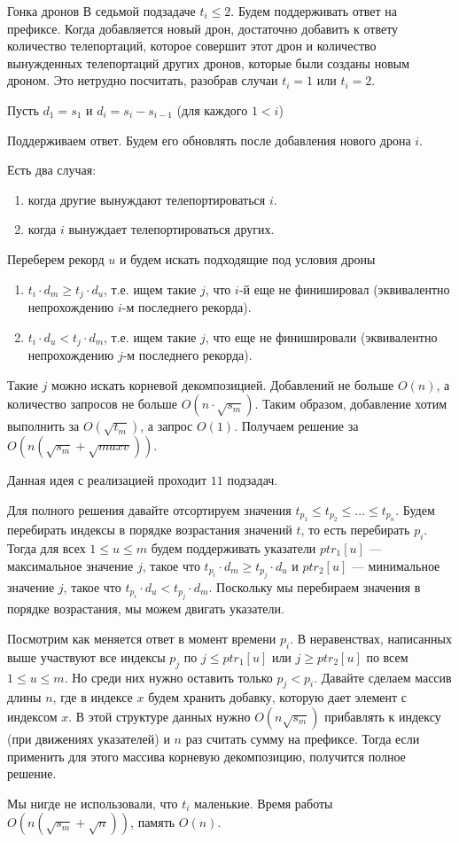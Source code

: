 \begin{tutorial}{Гонка дронов}
В седьмой подзадаче $t_i \le 2$. Будем поддерживать ответ на префиксе. Когда добавляется новый дрон, достаточно добавить к ответу количество телепортаций, которое совершит этот дрон и количество вынужденных телепортаций других дронов, которые были созданы новым дроном. Это нетрудно посчитать, разобрав случаи $t_i = 1$ или $t_i = 2$. 

Пусть $d_1 = s_1$ и $d_i = s_i-s_{i-1}$ (для каждого $1<i$)

Поддерживаем ответ. Будем его обновлять после добавления нового дрона $i$.

Есть два случая:

\begin{enumerate}
\item когда другие вынуждают телепортироваться $i$.
\item когда $i$ вынуждает телепортироваться других.
\end{enumerate}

Переберем рекорд $u$ и будем искать подходящие под условия дроны

\begin{enumerate}
\item $t_i\cdot d_m \geq t_j\cdot d_u$, т.е. ищем такие $j$, что $i$-й еще не финишировал (эквивалентно непрохождению $i$-м последнего рекорда).
\item $t_i\cdot d_u < t_j\cdot d_m$, т.е. ищем такие $j$, что еще не финишировали (эквивалентно непрохождению $j$-м последнего рекорда).
\end{enumerate}

Такие $j$ можно искать корневой декомпозицией. Добавлений не больше $O(n)$, а количество запросов не больше $O(n\cdot \sqrt{s_m})$. Таким образом, добавление хотим выполнить за $O(\sqrt{t_m})$, а запрос $O(1)$. Получаем решение за $O(n (\sqrt{s_m} + \sqrt{maxv}))$.

Данная идея с реализацией проходит $11$ подзадач. 

Для полного решения давайте отсортируем значения $t_{p_1} \leq t_{p_2} \leq \ldots \leq t_{p_n}$. Будем перебирать индексы в порядке возрастания значений $t$, то есть перебирать $p_i$. Тогда для всех $1 \leq u \leq m$ будем поддерживать указатели $ptr_1[u]$ --- максимальное значение $j$, такое что $t_{p_i}\cdot d_m \geq t_{p_j}\cdot d_u$ и $ptr_2[u]$ --- минимальное значение $j$, такое что $t_{p_i}\cdot d_u < t_{p_j}\cdot d_m$. Поскольку мы перебираем значения в порядке возрастания, мы можем двигать указатели.

Посмотрим как меняется ответ в момент времени $p_i$. В неравенствах, написанных выше участвуют все индексы $p_j$ по $j \leq ptr_1[u]$ или $j \geq ptr_2[u]$ по всем $1 \leq u \leq m$. Но среди них нужно оставить только $p_j < p_i$. Давайте сделаем массив длины $n$, где в индексе $x$ будем хранить добавку, которую дает элемент с индексом $x$. В этой структуре данных нужно $O(n \sqrt{s_m})$ прибавлять к индексу (при движениях указателей) и $n$ раз считать сумму на префиксе. Тогда если применить для этого массива корневую декомпозицию, получится полное решение.

Мы нигде не использовали, что $t_i$ маленькие. Время работы $O(n (\sqrt{s_m} + \sqrt{n}))$, память $O(n)$.


\end{tutorial}
